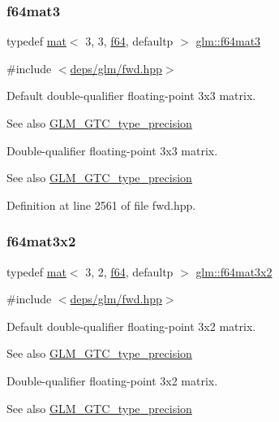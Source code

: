 \subsubsection{\texorpdfstring{f64mat3}{f64mat3}}
{\footnotesize\ttfamily typedef \hyperlink{structglm_1_1mat}{mat}$<$ 3, 3, \hyperlink{group__gtc__type__precision_ga2bba392e555124b36cde6abba349bab3}{f64}, defaultp $>$ \hyperlink{group__gtc__type__precision_ga44a41778554076393a2c59a98fe5128e}{glm\+::f64mat3}}



{\ttfamily \#include $<$\hyperlink{fwd_8hpp}{deps/glm/fwd.\+hpp}$>$}

Default double-\/qualifier floating-\/point 3x3 matrix. \begin{DoxySeeAlso}{See also}
\hyperlink{group__gtc__type__precision}{G\+L\+M\+\_\+\+G\+T\+C\+\_\+type\+\_\+precision}
\end{DoxySeeAlso}
Double-\/qualifier floating-\/point 3x3 matrix. \begin{DoxySeeAlso}{See also}
\hyperlink{group__gtc__type__precision}{G\+L\+M\+\_\+\+G\+T\+C\+\_\+type\+\_\+precision} 
\end{DoxySeeAlso}


Definition at line 2561 of file fwd.\+hpp.

\mbox{\label{group__gtc__type__precision_ga311a3bf48bfe2c95150e9f71db9063c5}} 
\subsubsection{\texorpdfstring{f64mat3x2}{f64mat3x2}}
{\footnotesize\ttfamily typedef \hyperlink{structglm_1_1mat}{mat}$<$ 3, 2, \hyperlink{group__gtc__type__precision_ga2bba392e555124b36cde6abba349bab3}{f64}, defaultp $>$ \hyperlink{group__gtc__type__precision_ga311a3bf48bfe2c95150e9f71db9063c5}{glm\+::f64mat3x2}}



{\ttfamily \#include $<$\hyperlink{fwd_8hpp}{deps/glm/fwd.\+hpp}$>$}

Default double-\/qualifier floating-\/point 3x2 matrix. \begin{DoxySeeAlso}{See also}
\hyperlink{group__gtc__type__precision}{G\+L\+M\+\_\+\+G\+T\+C\+\_\+type\+\_\+precision}
\end{DoxySeeAlso}
Double-\/qualifier floating-\/point 3x2 matrix. \begin{DoxySeeAlso}{See also}
\hyperlink{group__gtc__type__precision}{G\+L\+M\+\_\+\+G\+T\+C\+\_\+type\+\_\+precision} 
\end{DoxySeeAlso}


